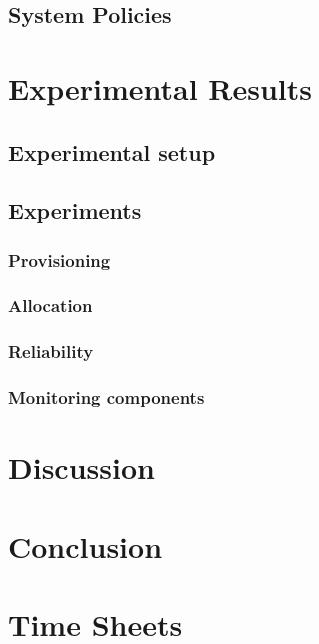 \documentclass[a4paper]{IEEEtran}
\begin{document}




\subsection{System Policies}


\section{Experimental Results}

\subsection{Experimental setup}




\subsection{Experiments}
\subsubsection{Provisioning}

\subsubsection{Allocation}

\subsubsection{Reliability}

\subsubsection{Monitoring components}


\section{Discussion}

\section{Conclusion}





\appendix
\section{Time Sheets}
\end{document}
